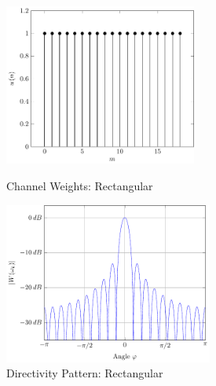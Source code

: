 \begin{figure}[h!]
    \begin{minipage}{0.49\textwidth}
    \centering
    \includegraphics[height=5.3cm]{images/3_Parametric_array/Rectangular_Window.pdf}
    \caption{Channel Weights: Rectangular}
    \label{3_subfig:directivity_no_steer_lambda2}
    \end{minipage}
    \begin{minipage}{0.49\textwidth}
    \centering
    \includegraphics[height=5.3cm]{images/3_Parametric_array/Rectangle.pdf}
    \caption{Directivity Pattern: Rectangular}
     \label{3_subfig:directivity_no_steer_lambda3}
    \end{minipage}
\end{figure}

